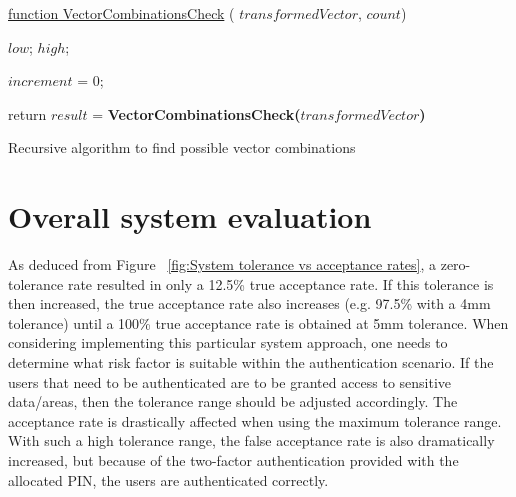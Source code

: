 \begin{algorithm}
     
     \underline{function VectorCombinationsCheck} ( $transformedVector$, $count$)\;
     
      $low$;
      $high$;
     
     $increment$ = 0;
     
     
     
     return $result$ = \textbf{VectorCombinationsCheck($transformedVector$)}
     
     
     \caption{Recursive algorithm to find possible vector combinations}
\end{algorithm}


\section{Overall system evaluation}

As deduced from Figure ~\ref{fig:System tolerance vs acceptance rates}, a zero-tolerance rate resulted in only a 12.5\% true acceptance rate. If this tolerance is then increased, the true acceptance rate also increases (e.g. 97.5\% with a 4mm tolerance) until a 100\% true acceptance rate is obtained at 5mm tolerance. 
When considering implementing this particular system approach, one needs to determine what risk factor is suitable within the authentication scenario. If the users that need to be authenticated are to be granted access to sensitive data/areas, then the tolerance range should be adjusted accordingly. The acceptance rate is drastically affected when using the maximum tolerance range. With such a high tolerance range, the false acceptance rate is also dramatically increased, but because of the two-factor authentication provided with the allocated PIN, the users are authenticated correctly.

